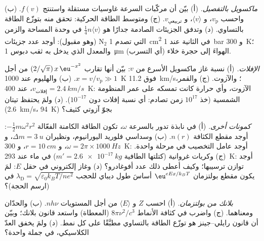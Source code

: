 \begin{exercise}[$\star\star$]\label{exo:b2:boltzmann-factor:8}
\emph{ماكسويل بالتفصيل.} (أ) بيّن أن مركّبات السرعة
غاوسيات مستقلة واستنتج $f(v)$. (ب) واحسب $v_{\text{p}}$،
و $\langle v\rangle$، و $v_{\text{تربيعي}}$. (ج) ومتوسط الطاقة الحركية: تحقق منه
بتوزّع الطاقة بالتساوي. (د) وتدفق الجزيئات الصادمة جدارًا هو
$\tfrac14n\langle v\rangle$ في وحدة المساحة والزمن (وهو مقبول): أوجد عدد جزيئات
N$_2$ التي تصدم \qty{1}{cm^2} في الثانية عند \qty{1}{bar} و
\qty{300}{K}؛ والمعدل الذي يدخل به ثقب دبوس \qty{1}{\micro m} الهواءَ
إلى حجرة خلاء (أي التسرب).
\end{exercise}

\begin{exercise}[$\star\star$]\label{exo:b2:boltzmann-factor:9}
\emph{الإفلات.} (أ) نسبة غاز ماكسويل الأسرع من $v$: بيّن أنها
تقارب $(2/\sqrt\pi)\,x\,\eu^{-x^2}$ من أجل $x = v/v_{\text{p}} \gg 1$.
(ب) والهليوم عند \qty{1000}{K} فوق \qty{11.2}{km/s}؛ والآزوت. (ج) والقمر،
$v_{\text{إفلات}} = \qty{2.4}{km/s}$، عند \qty{400}{K}: الآزوت، وأي
حرارة كانت تمسكه على عمر المنظومة الشمسية (خذ $10^{17}$
زمن تصادم: أي نسبة إفلات دون $10^{-17}$). (د) ولمَ يحتفظ تيتان
(\qty{2.6}{km/s}، \qty{94}{K}) بجوّ آزوتي كثيف؟
\end{exercise}

\begin{exercise}[$\star\star\star$]\label{exo:b2:boltzmann-factor:10}
\emph{كمونات أخرى.} (أ) في نابذة تدور بالسرعة $\omega$، تكون
الطاقة الكامنة الفعّالة $-\tfrac12m\omega^2r^2$: أوجد مقطع الكثافة
$n(r)$. (ب) وسداسي فلوريد اليورانيوم، ونظيران $\Delta m = \qty{3}{u}$، و $\omega
= 2\pi \times \qty{1000}{Hz}$، و $r = \qty{10}{cm}$، و \qty{300}{K}: أوجد عامل
التخصيب في مرحلة واحدة. (ج) وكريات غروانية (كتلتها الطافية $m' =
\qty{2.6e-17}{kg}$) في ماء عند \qty{293}{K}: أوجد 
توازن ترسيبها؛ وكيف أعطى ذلك عدد أفوغادرو؟ (د) وغاز
إلكتروني في حقل $E$: لمَ يكون مقطع بولتزمان
$\eu^{eEx/k_BT}$ أساسَ طول ديباي للحجب
$\lambda_{\text{D}} = \sqrt{\varepsilon_0k_BT/ne^2}$ في  (ارسم
الحجة)؟
\end{exercise}

\begin{exercise}[$\star\star\star$]\label{exo:b2:boltzmann-factor:11}
\emph{بلانك من بولتزمان.} (أ) احسب $Z$ و $\langle E\rangle$ من أجل
المستويات $nh\nu$. (ب) والحدّان ومعناهما. (ج) واضرب في
كثافة الأنماط $8\pi\nu^2/c^3$ (المعطاة) واستعد قانون بلانك؛
وبيّن أن قانون رايلي--جينز هو توزّع الطاقة بالتساوي مطبَّقًا على كل نمط.
(د) ولمَ يخفق العدّ الكلاسيكي، في جملة واحدة؟
\end{exercise}

